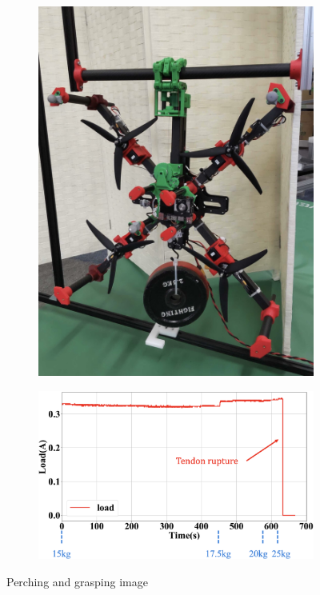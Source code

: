 \documentclass{jarticle}
\begin{document}
\begin{figure}[tb]
  \centering
  \begin{subfigure}{0.28\columnwidth}
    \includegraphics[width=\textwidth]{figs/bear1.eps}
    \vspace{-6mm}
    \caption{}
    \label{fig:bear1}
  \end{subfigure}
  \begin{subfigure}{0.6\columnwidth}
    \includegraphics[width=\textwidth]{figs/bear2.eps}
    \vspace{-6mm}
    \caption{}
    \label{fig:bear2}
  \end{subfigure}
  \vspace{1mm}
  \caption{Perching and grasping image}
  \vspace{-4mm}
\end{figure}
\end{document}
